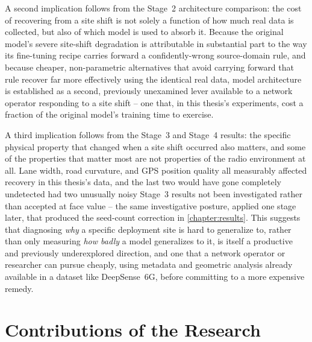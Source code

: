 \documentclass{iutbscthesis}
\begin{document}
A second implication follows from the Stage~2 architecture comparison: the cost of recovering from a site shift is not solely a function of how much real data is collected, but also of which model is used to absorb it. Because the original model's severe site-shift degradation is attributable in substantial part to the way its fine-tuning recipe carries forward a confidently-wrong source-domain rule, and because cheaper, non-parametric alternatives that avoid carrying forward that rule recover far more effectively using the identical real data, model architecture is established as a second, previously unexamined lever available to a network operator responding to a site shift -- one that, in this thesis's experiments, cost a fraction of the original model's training time to exercise.

A third implication follows from the Stage~3 and Stage~4 results: the specific physical property that changed when a site shift occurred also matters, and some of the properties that matter most are not properties of the radio environment at all. Lane width, road curvature, and GPS position quality all measurably affected recovery in this thesis's data, and the last two would have gone completely undetected had two unusually noisy Stage~3 results not been investigated rather than accepted at face value -- the same investigative posture, applied one stage later, that produced the seed-count correction in \autoref{chapter:results}. This suggests that diagnosing \emph{why} a specific deployment site is hard to generalize to, rather than only measuring \emph{how badly} a model generalizes to it, is itself a productive and previously underexplored direction, and one that a network operator or researcher can pursue cheaply, using metadata and geometric analysis already available in a dataset like DeepSense~6G, before committing to a more expensive remedy.

\section{Contributions of the Research}
\end{document}
